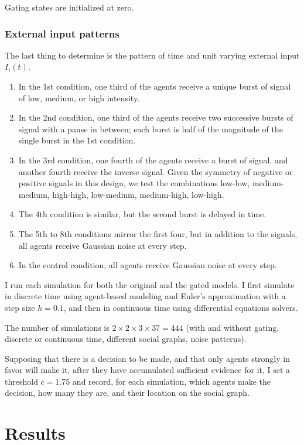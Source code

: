 \documentclass[]{article}
\begin{document}
Gating states are initialized at zero.

\subsubsection{External input patterns}
The last thing to determine is the pattern of time and unit varying external input $I_i(t)$. 
\begin{enumerate}
	\item In the 1st condition, one third of the agents receive a unique burst of signal of low, medium, or high intensity. 
	\item In the 2nd condition, one third of the agents receive two successive bursts of signal with a pause in between; each burst is half of the magnitude of the single burst in the 1st condition.
	\item In the 3rd condition, one fourth of the agents receive a burst of signal, and another fourth receive the inverse signal. Given the symmetry of negative or positive signals in this design, we test the combinations low-low, medium-medium, high-high, low-medium, medium-high, low-high. 
	\item The 4th condition is similar, but the second burst is delayed in time.
	\item The 5th to 8th conditions mirror the first four, but in addition to the signals, all agents receive Gaussian noise at every step.
	\item In the control condition, all agents receive Gaussian noise at every step.
\end{enumerate}

I run each simulation for both the original and the gated models. I first simulate in discrete time using agent-based modeling and Euler's approximation with a step size $h = 0.1$, and then in continuous time using differential equations solvers.

The number of simulations is $2 \times 2 \times 3 \times 37 = 444$ (with and without gating, discrete or continuous time, different social graphs, noise patterns).

Supposing that there is a decision to be made, and that only agents strongly in favor will make it, after they have accumulated sufficient evidence for it, I set a threshold $c = 1.75$ and record, for each simulation, which agents make the decision, how many they are, and their location on the social graph.


\section{Results}
\end{document}
